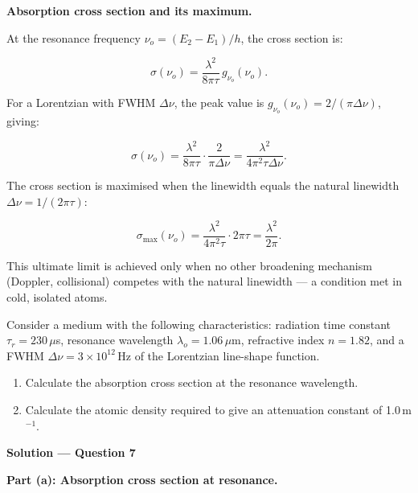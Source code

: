 \textbf{Absorption cross section and its maximum.}

At the resonance frequency $\nu_o = (E_2-E_1)/h$, the cross section is:

\begin{equation*}
  \sigma(\nu_o) = \frac{\lambda^{2}}{8\pi\tau}\,g_{\nu_o}(\nu_o).
\end{equation*}

For a Lorentzian with FWHM $\Delta\nu$, the peak value is $g_{\nu_o}(\nu_o) = 2/(\pi\Delta\nu)$, giving:

\begin{equation*}
  \sigma(\nu_o) = \frac{\lambda^{2}}{8\pi\tau}\cdot\frac{2}{\pi\Delta\nu} = \frac{\lambda^{2}}{4\pi^{2}\tau\Delta\nu}.
\end{equation*}

The cross section is maximised when the linewidth equals the natural linewidth $\Delta\nu = 1/(2\pi\tau)$:

\begin{equation*}
  \boxed{\sigma_{\mathrm{max}}(\nu_o) = \frac{\lambda^{2}}{4\pi^{2}\tau}\cdot 2\pi\tau = \frac{\lambda^{2}}{2\pi}.}
\end{equation*}

This ultimate limit is achieved only when no other broadening mechanism (Doppler, collisional) competes with the natural linewidth --- a condition met in cold, isolated atoms.


\begin{question}[Question 7]Consider a medium with the following characteristics: radiation time
constant $\tau_{r}=230\,\mu$s, resonance wavelength $\lambda_{o}=1.06\,\mu$m, refractive index
$n=1.82$, and a FWHM $\Delta\nu=3\times10^{12}$\,Hz of the Lorentzian line-shape function.

\begin{enumerate}[label=(\alph*)]
  \item Calculate the absorption cross section at the resonance wavelength.
  \item Calculate the atomic density required to give an attenuation constant of 1.0\,m$^{-1}$.
\end{enumerate}
\end{question}

\textbf{\large Solution --- Question 7}

\textbf{Part (a): Absorption cross section at resonance.}

